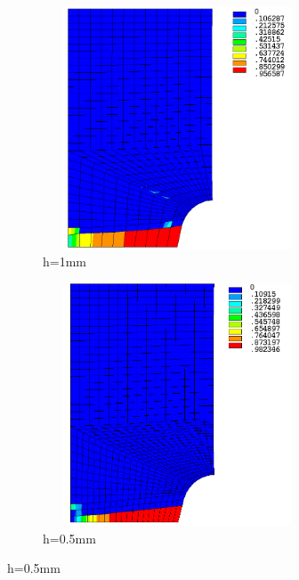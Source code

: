 \documentclass[12pt,a4paper,twoside,openright]{report}
\begin{document}
\\
\begin{figure}[htbp!]
 \centering
     \captionsetup[subfigure]{justification=centering}
     \begin{subfigure}{0.4\textwidth}
      \centering
         \includegraphics[width=8cm,height=7.2cm,keepaspectratio]{25.d2-1.png}
         \caption{h=1mm}
         \label{fig:d2-1}
     \end{subfigure}
     \hspace{1.8cm}
     \begin{subfigure}{0.4\textwidth}
      \centering
         \includegraphics[width=8cm,height=7.2cm,keepaspectratio]{25.d2-0.5.png}
         \caption{h=0.5mm}
         \label{fig:d2-0.5}
     \end{subfigure}
\end{figure}
\end{document}
